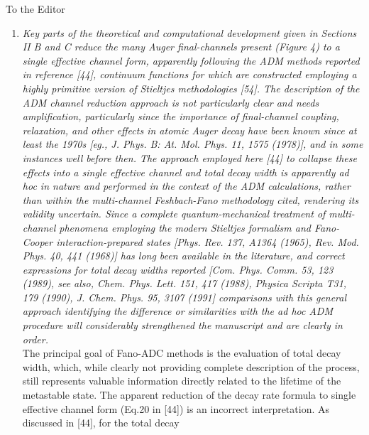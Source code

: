 \documentclass[DIN,pagenumber=false,parskip=half,fromalign=left,fromphone=true,fromemail=true,fromurl=false,fromlogo=false,fromrule=false]{scrlttr2}
\begin{document}
\begin{letter}{To the Editor}
\begin{enumerate}
 \item \emph{Key parts of the theoretical and computational development given
             in Sections II B and C reduce the many Auger final-channels present
             (Figure 4) to a single effective channel form, apparently following
             the ADM methods reported in reference [44], continuum functions for
             which are constructed employing a highly primitive version of
             Stieltjes methodologies [54]. The description of the ADM channel
             reduction approach is not particularly clear and needs amplification,
             particularly since the importance of final-channel coupling,
             relaxation, and other effects in atomic Auger decay have been known
             since at least the 1970s [eg., J. Phys. B: At. Mol. Phys. 11, 1575
             (1978)], and in some instances well before then. The approach
             employed here [44] to collapse these effects into a single effective
             channel and total decay width is apparently ad hoc in nature and
             performed in the context of the ADM calculations, rather than within
             the multi-channel Feshbach-Fano methodology cited, rendering its
             validity uncertain. Since a complete quantum-mechanical treatment
             of multi-channel phenomena employing the modern Stieltjes formalism
             and Fano-Cooper interaction-prepared states [Phys. Rev. 137, A1364
             (1965), Rev. Mod. Phys. 40, 441 (1968)] has long been available in
             the literature, and correct expressions for total decay widths
             reported [Com. Phys. Comm. 53, 123 (1989), see also, Chem. Phys.
             Lett. 151, 417 (1988), Physica Scripta T31, 179 (1990), J. Chem.
             Phys. 95, 3107 (1991] comparisons with this general approach
             identifying the difference or similarities with the ad hoc ADM
             procedure will considerably strengthened the manuscript and are
             clearly in order.}\\
         The principal goal of Fano-ADC methods is the evaluation of total decay
         width, which, while clearly not providing complete description of the
         process, still represents valuable information directly related to the
         lifetime of the metastable state. The apparent reduction of the decay
         rate formula to single effective channel form (Eq.20 in [44]) is an
         incorrect interpretation. As discussed in [44], for the total decay

\end{enumerate}
\end{letter}
\end{document}
